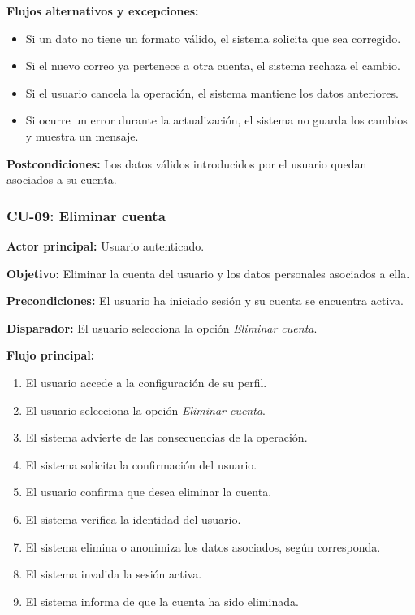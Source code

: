 \noindent \textbf{Flujos alternativos y excepciones:}
\begin{itemize}
    \item Si un dato no tiene un formato válido, el sistema solicita que sea corregido.
    \item Si el nuevo correo ya pertenece a otra cuenta, el sistema rechaza el cambio.
    \item Si el usuario cancela la operación, el sistema mantiene los datos anteriores.
    \item Si ocurre un error durante la actualización, el sistema no guarda los cambios y muestra un mensaje.
\end{itemize}

\noindent \textbf{Postcondiciones:} Los datos válidos introducidos por el usuario quedan asociados a su cuenta.

\subsubsection{CU-09: Eliminar cuenta}

\noindent \textbf{Actor principal:} Usuario autenticado.

\noindent \textbf{Objetivo:} Eliminar la cuenta del usuario y los datos personales asociados a ella.

\noindent \textbf{Precondiciones:} El usuario ha iniciado sesión y su cuenta se encuentra activa.

\noindent \textbf{Disparador:} El usuario selecciona la opción \textit{Eliminar cuenta}.

\noindent \textbf{Flujo principal:}
\begin{enumerate}
    \item El usuario accede a la configuración de su perfil.
    \item El usuario selecciona la opción \textit{Eliminar cuenta}.
    \item El sistema advierte de las consecuencias de la operación.
    \item El sistema solicita la confirmación del usuario.
    \item El usuario confirma que desea eliminar la cuenta.
    \item El sistema verifica la identidad del usuario.
    \item El sistema elimina o anonimiza los datos asociados, según corresponda.
    \item El sistema invalida la sesión activa.
    \item El sistema informa de que la cuenta ha sido eliminada.
\end{enumerate}

